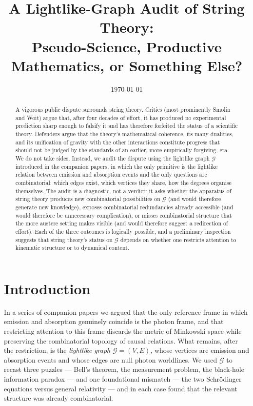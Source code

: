 \documentclass[11pt]{article}
\title{A Lightlike-Graph Audit of String Theory:\\
Pseudo-Science, Productive Mathematics, or Something Else?}
\date{\today}
\begin{document}
\maketitle

\begin{abstract}
A vigorous public dispute surrounds string theory. Critics (most prominently Smolin and Woit) argue that, after four decades of effort, it has produced no experimental prediction sharp enough to falsify it and has therefore forfeited the status of a scientific theory. Defenders argue that the theory's mathematical coherence, its many dualities, and its unification of gravity with the other interactions constitute progress that should not be judged by the standards of an earlier, more empirically forgiving, era. We do not take sides. Instead, we audit the dispute using the lightlike graph $\mathcal{G}$ introduced in the companion papers, in which the only primitive is the lightlike relation between emission and absorption events and the only questions are combinatorial: which edges exist, which vertices they share, how the degrees organise themselves. The audit is a diagnostic, not a verdict: it asks whether the apparatus of string theory produces new combinatorial possibilities on $\mathcal{G}$ (and would therefore generate new knowledge), exposes combinatorial redundancies already accessible (and would therefore be unnecessary complication), or misses combinatorial structure that the more austere setting makes visible (and would therefore suggest a redirection of effort). Each of the three outcomes is logically possible, and a preliminary inspection suggests that string theory's status on $\mathcal{G}$ depends on whether one restricts attention to kinematic structure or to dynamical content.
\end{abstract}

\section{Introduction}

In a series of companion papers we argued that the only reference frame in which emission and absorption genuinely coincide is the photon frame, and that restricting attention to this frame discards the metric of Minkowski space while preserving the combinatorial topology of causal relations. What remains, after the restriction, is the \emph{lightlike graph} $\mathcal{G} = (V, E)$, whose vertices are emission and absorption events and whose edges are null photon worldlines. We used $\mathcal{G}$ to recast three puzzles --- Bell's theorem, the measurement problem, the black-hole information paradox --- and one foundational mismatch --- the two Schr\"odinger equations versus general relativity --- and in each case found that the relevant structure was already combinatorial.
\end{document}
